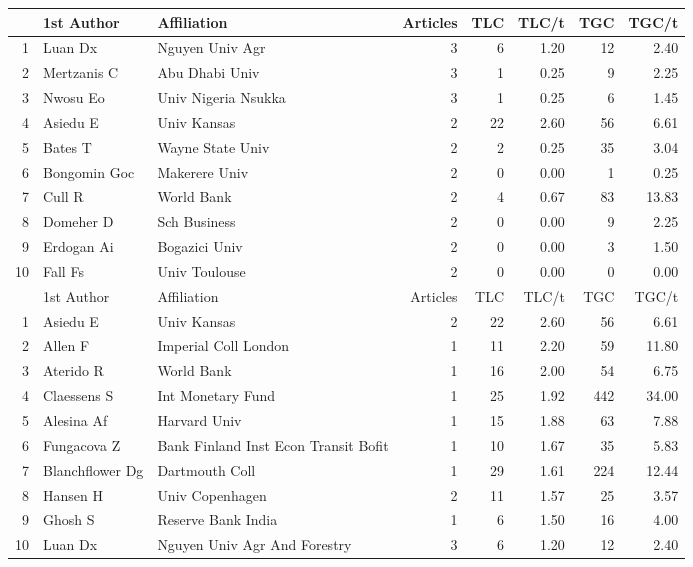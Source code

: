 \begin{table}[ht]
\centering
\footnotesize
\begin{tabular}{rllrrrrr}
  \toprule
 & 1st Author & Affiliation & Articles & TLC & TLC/t & TGC & TGC/t \\ 
 \midrule
1 & Luan Dx & Nguyen Univ Agr  &   3 &   6 & 1.20 &  12 & 2.40 \\ 
  2 & Mertzanis C & Abu Dhabi Univ &   3 &   1 & 0.25 &   9 & 2.25 \\ 
  3 & Nwosu Eo & Univ Nigeria Nsukka &   3 &   1 & 0.25 &   6 & 1.45 \\ 
  4 & Asiedu E & Univ Kansas &   2 &  22 & 2.60 &  56 & 6.61 \\ 
  5 & Bates T & Wayne State Univ &   2 &   2 & 0.25 &  35 & 3.04 \\ 
  6 & Bongomin Goc & Makerere Univ &   2 &   0 & 0.00 &   1 & 0.25 \\ 
  7 & Cull R & World Bank &   2 &   4 & 0.67 &  83 & 13.83 \\ 
  8 & Domeher D & Sch Business &   2 &   0 & 0.00 &   9 & 2.25 \\ 
  9 & Erdogan Ai & Bogazici Univ &   2 &   0 & 0.00 &   3 & 1.50 \\ 
  10 & Fall Fs & Univ Toulouse &   2 &   0 & 0.00 &   0 & 0.00 \\ 

  \midrule
     & 1st Author & Affiliation & Articles & TLC & TLC/t & TGC & TGC/t \\ 
  \midrule
  
   1 & Asiedu E & Univ Kansas &   2 &  22 & 2.60 &  56 & 6.61 \\ 
   2 & Allen F & Imperial Coll London &   1 &  11 & 2.20 &  59 & 11.80 \\ 
   3 & Aterido R & World Bank &   1 &  16 & 2.00 &  54 & 6.75 \\ 
   4 & Claessens S & Int Monetary Fund &   1 &  25 & 1.92 & 442 & 34.00 \\ 
   5 & Alesina Af & Harvard Univ &   1 &  15 & 1.88 &  63 & 7.88 \\ 
   6 & Fungacova Z & Bank Finland Inst Econ Transit Bofit &   1 &  10 & 1.67 &  35 & 5.83 \\ 
   7 & Blanchflower Dg & Dartmouth Coll &   1 &  29 & 1.61 & 224 & 12.44 \\ 
   8 & Hansen H & Univ Copenhagen &   2 &  11 & 1.57 &  25 & 3.57 \\ 
   9 & Ghosh S & Reserve Bank India &   1 &   6 & 1.50 &  16 & 4.00 \\ 
   10 & Luan Dx & Nguyen Univ Agr And Forestry &   3 &   6 & 1.20 &  12 & 2.40 \\ 


\end{tabular}
\end{table}
